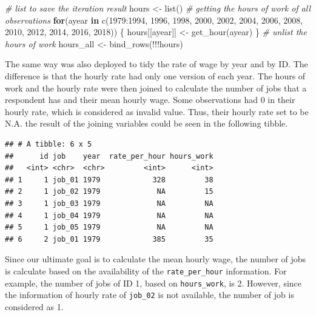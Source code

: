 \documentclass{article}
\newenvironment{Shaded}{\begin{snugshade}}{\end{snugshade}}
\newcommand{\CommentTok}[1]{\textcolor[rgb]{0.56,0.35,0.01}{\textit{#1}}}
\newcommand{\ControlFlowTok}[1]{\textcolor[rgb]{0.13,0.29,0.53}{\textbf{#1}}}
\newcommand{\DecValTok}[1]{\textcolor[rgb]{0.00,0.00,0.81}{#1}}
\newcommand{\FunctionTok}[1]{\textcolor[rgb]{0.00,0.00,0.00}{#1}}
\newcommand{\NormalTok}[1]{#1}
\newcommand{\OtherTok}[1]{\textcolor[rgb]{0.56,0.35,0.01}{#1}}
\newcommand{\SpecialCharTok}[1]{\textcolor[rgb]{0.00,0.00,0.00}{#1}}
\begin{document}
\begin{Shaded}
\begin{Highlighting}[]
\CommentTok{\# list to save the iteration result}
\NormalTok{hours }\OtherTok{\textless{}{-}} \FunctionTok{list}\NormalTok{()}
\CommentTok{\# getting the hours of work of all observations}
\ControlFlowTok{for}\NormalTok{(ayear }\ControlFlowTok{in} \FunctionTok{c}\NormalTok{(}\DecValTok{1979}\SpecialCharTok{:}\DecValTok{1994}\NormalTok{, }\DecValTok{1996}\NormalTok{, }\DecValTok{1998}\NormalTok{, }\DecValTok{2000}\NormalTok{, }\DecValTok{2002}\NormalTok{, }\DecValTok{2004}\NormalTok{, }\DecValTok{2006}\NormalTok{, }\DecValTok{2008}\NormalTok{, }\DecValTok{2010}\NormalTok{, }
               \DecValTok{2012}\NormalTok{, }\DecValTok{2014}\NormalTok{, }\DecValTok{2016}\NormalTok{, }\DecValTok{2018}\NormalTok{)) \{}
\NormalTok{   hours[[ayear]] }\OtherTok{\textless{}{-}} \FunctionTok{get\_hour}\NormalTok{(ayear)}
\NormalTok{\}}
\CommentTok{\# unlist the hours of work}
\NormalTok{hours\_all }\OtherTok{\textless{}{-}} \FunctionTok{bind\_rows}\NormalTok{(}\SpecialCharTok{!!!}\NormalTok{hours)}
\end{Highlighting}
\end{Shaded}

The same way was also deployed to tidy the rate of wage by year and by ID. The difference is that the hourly rate had only one version of each year. The hours of work and the hourly rate were then joined to calculate the number of jobs that a respondent has and their mean hourly wage. Some observations had 0 in their hourly rate, which is considered as invalid value. Thus, their hourly rate set to be N.A. the result of the joining variables could be seen in the following tibble.

\begin{verbatim}
## # A tibble: 6 x 5
##      id job    year  rate_per_hour hours_work
##   <int> <chr>  <chr>         <int>      <int>
## 1     1 job_01 1979            328         38
## 2     1 job_02 1979             NA         15
## 3     1 job_03 1979             NA         NA
## 4     1 job_04 1979             NA         NA
## 5     1 job_05 1979             NA         NA
## 6     2 job_01 1979            385         35
\end{verbatim}

Since our ultimate goal is to calculate the mean hourly wage, the number of jobs is calculate based on the availability of the \texttt{rate\_per\_hour} information. For example, the number of jobs of ID 1, based on \texttt{hours\_work}, is 2. However, since the information of hourly rate of \texttt{job\_02} is not available, the number of job is considered as 1.
\end{document}
